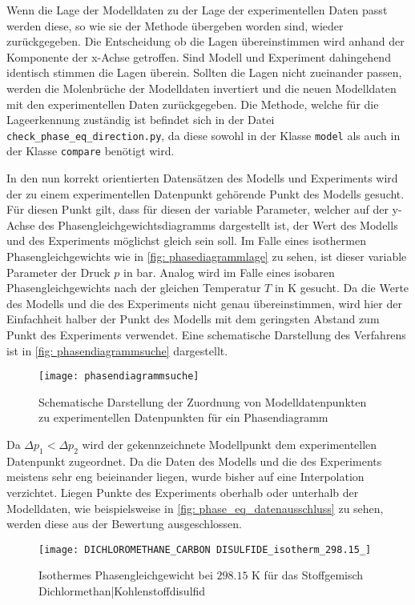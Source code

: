 \documentclass[../thesis.tex]{subfiles}
\begin{document}
Wenn die Lage der Modelldaten zu der Lage der experimentellen Daten passt werden diese, so wie sie der Methode übergeben worden sind, wieder zurückgegeben. Die Entscheidung ob die Lagen übereinstimmen wird anhand der Komponente der x-Achse getroffen. Sind Modell und Experiment dahingehend identisch stimmen die Lagen überein. Sollten die Lagen nicht zueinander passen, werden die Molenbrüche der Modelldaten invertiert und die neuen Modelldaten mit den experimentellen Daten zurückgegeben. Die Methode, welche für die Lageerkennung zuständig ist befindet sich in der Datei \texttt{check\_phase\_eq\_direction.py}, da diese sowohl in der Klasse \texttt{model} als auch in der Klasse \texttt{compare} benötigt wird.

In den nun korrekt orientierten Datensätzen des Modells und Experiments wird der zu einem experimentellen Datenpunkt gehörende Punkt des Modells gesucht. Für diesen Punkt gilt, dass für diesen der variable Parameter, welcher auf der y-Achse des Phasengleichgewichtsdiagramms dargestellt ist, der Wert des Modells und des Experiments möglichst gleich sein soll. Im Falle eines isothermen Phasengleichgewichts wie in \autoref{fig: phasediagrammlage} zu sehen, ist dieser variable Parameter der Druck $ p $ in bar. Analog wird im Falle eines isobaren Phasengleichgewichts nach der gleichen Temperatur $ T $ in K gesucht. Da die Werte des Modells und die des Experiments nicht genau übereinstimmen, wird hier der Einfachheit halber der Punkt des Modells mit dem geringsten Abstand zum Punkt des Experiments verwendet. Eine schematische Darstellung des Verfahrens ist in \autoref{fig: phasendiagrammsuche} dargestellt. 

\begin{figure}[htb]
	\centering
	\texttt{[image: phasendiagrammsuche]}
	\caption{Schematische Darstellung der Zuordnung von Modelldatenpunkten zu experimentellen Datenpunkten für ein Phasendiagramm}
	\label{fig: phasendiagrammsuche}
\end{figure}

Da $\Delta p_1 < \Delta p_2$ wird der gekennzeichnete Modellpunkt dem experimentellen Datenpunkt zugeordnet. Da die Daten des Modells und die des Experiments meistens sehr eng beieinander liegen, wurde bisher auf eine Interpolation verzichtet. Liegen Punkte des Experiments oberhalb oder unterhalb der Modelldaten, wie beispielsweise in \autoref{fig: phase_eq_datenausschluss} zu sehen, werden diese aus der Bewertung ausgeschlossen. 

\begin{figure}[htb]
	\centering
	\texttt{[image: DICHLOROMETHANE\_CARBON DISULFIDE\_isotherm\_298.15\_]}
	\caption{Isothermes Phasengleichgewicht bei $ 298$.$15$ K für das Stoffgemisch Dichlormethan|Kohlenstoffdisulfid}
	\label{fig: phase_eq_datenausschluss}
\end{figure}
\end{document}
